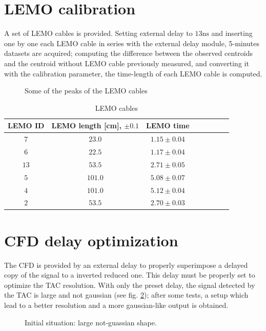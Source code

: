\documentclass[11pt,a4 paper]{article}
\begin{document}
\section{LEMO calibration}
A set of LEMO cables is provided. Setting external delay to $13\si{\nano\second}$ and inserting one by one each LEMO cable in series with the external delay module, 5-minutes datasets are acquired; computing the difference between the observed centroids and the centroid without LEMO cable previously measured, and converting it with the calibration parameter, the time-length of each LEMO cable is computed.

\begin{figure}[H]
    \centering
    \caption{Some of the peaks of the LEMO cables}
    \label{fig:lemo}
\end{figure}

\begin{table}[H]
    \centering
    \begin{tabular}{cccccccc}
        \toprule
        LEMO ID & LEMO length [cm], $\pm 0.1$ & LEMO time \\
        \midrule
        $7$ & $23.0$ & $1.15\pm0.04$\\
        $6$ & $22.5$ & $1.17\pm0.04$\\
        $13$ & $53.5$ & $2.71\pm0.05$\\
        $5$ & $101.0$ & $5.08\pm0.07$\\
        $4$ & $101.0$ & $5.12\pm0.04$\\
        $2$ & $53.5$ & $2.70\pm0.03$\\
        \bottomrule
    \end{tabular}
    \caption{LEMO cables}
    \label{tab:lemo}
\end{table}

\section{CFD delay optimization}

The CFD is provided by an external delay to properly superimpose a delayed copy of the signal to a inverted reduced one. This delay must be properly set to optimize the TAC resolution. With only the preset delay, the signal detected by the TAC is large and not gaussian (see fig. \ref{fig:delay:bad}); after some tests, a setup which lead to a better resolution and a more gaussian-like output is obtained.

\begin{figure}[H]
    \centering
    \caption{Initial situation: large not-guassian shape.}
    \label{fig:delay:bad}
\end{figure}
\end{document}
